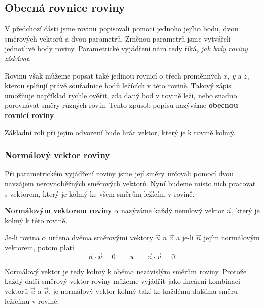 \subsection{Obecná rovnice roviny}
\label{subsec:General_plane_equation}

V předchozí části jsme rovinu popisovali pomocí jednoho jejího bodu,
dvou směrových vektorů a dvou parametrů. Změnou parametrů jsme vytvářeli
jednotlivé body roviny. Parametrické vyjádření nám tedy říká,
\emph{jak body roviny získávat}.

Rovinu však můžeme popsat také jedinou rovnicí o třech proměnných $x$,
$y$ a $z$, kterou splňují právě souřadnice bodů ležících v této rovině.
Takový zápis umožňuje například rychle ověřit, zda daný bod v rovině leží,
nebo snadno porovnávat směry různých rovin. Tento způsob popisu nazýváme
\textbf{obecnou rovnicí roviny}.

Základní roli při jejím odvození bude hrát vektor, který je k rovině kolmý.


\subsubsection{Normálový vektor roviny}
\label{subsubsec:Normal_vector_plane}

Při parametrickém vyjádření roviny jsme její směry určovali pomocí dvou
navzájem nerovnoběžných směrových vektorů. Nyní budeme místo nich pracovat
s vektorem, který je kolmý ke všem směrům ležícím v rovině.

\begin{definition}
    \label{def:Normal_vector_plane}

    \textbf{Normálovým vektorem roviny} $\alpha$ nazýváme každý nenulový
    vektor $\vec{n}$, který je kolmý k této rovině.
\end{definition}

Je-li rovina $\alpha$ určena dvěma směrovými vektory $\vec{u}$ a
$\vec{v}$ a je-li $\vec{n}$ jejím normálovým vektorem, potom platí
\begin{equation}
    \vec{n}\cdot\vec{u}=0
    \qquad\text{a}\qquad
    \vec{n}\cdot\vec{v}=0.
    \label{eq:Normal_vector_plane_orthogonality}
\end{equation}

Normálový vektor je tedy kolmý k oběma nezávislým směrům roviny.
Protože každý další směrový vektor roviny můžeme vyjádřit jako lineární
kombinaci vektorů $\vec{u}$ a $\vec{v}$, je normálový vektor kolmý také
ke každému dalšímu směru ležícímu v rovině.

